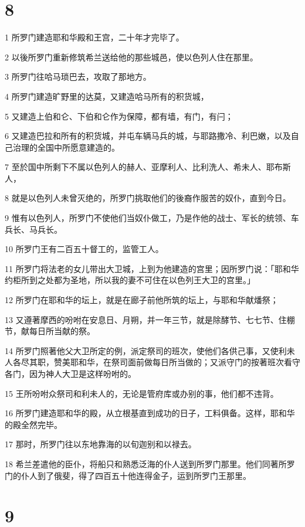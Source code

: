 \chapter{8}

\par 1 所罗门建造耶和华殿和王宫，二十年才完毕了。
\par 2 以後所罗门重新修筑希兰送给他的那些城邑，使以色列人住在那里。
\par 3 所罗门往哈马琐巴去，攻取了那地方。
\par 4 所罗门建造旷野里的达莫，又建造哈马所有的积货城，
\par 5 又建造上伯和仑、下伯和仑作为保障，都有墙，有门，有闩；
\par 6 又建造巴拉和所有的积货城，并屯车辆马兵的城，与耶路撒冷、利巴嫩，以及自己治理的全国中所愿意建造的。
\par 7 至於国中所剩下不属以色列人的赫人、亚摩利人、比利洗人、希未人、耶布斯人，
\par 8 就是以色列人未曾灭绝的，所罗门挑取他们的後裔作服苦的奴仆，直到今日。
\par 9 惟有以色列人，所罗门不使他们当奴仆做工，乃是作他的战士、军长的统领、车兵长、马兵长。
\par 10 所罗门王有二百五十督工的，监管工人。
\par 11 所罗门将法老的女儿带出大卫城，上到为他建造的宫里；因所罗门说：「耶和华约柜所到之处都为圣地，所以我的妻不可住在以色列王大卫的宫里。」
\par 12 所罗门在耶和华的坛上，就是在廊子前他所筑的坛上，与耶和华献燔祭；
\par 13 又遵著摩西的吩咐在安息日、月朔，并一年三节，就是除酵节、七七节、住棚节，献每日所当献的祭。
\par 14 所罗门照著他父大卫所定的例，派定祭司的班次，使他们各供己事，又使利未人各尽其职，赞美耶和华，在祭司面前做每日所当做的；又派守门的按著班次看守各门，因为神人大卫是这样吩咐的。
\par 15 王所吩咐众祭司和利未人的，无论是管府库或办别的事，他们都不违背。
\par 16 所罗门建造耶和华的殿，从立根基直到成功的日子，工料俱备。这样，耶和华的殿全然完毕。
\par 17 那时，所罗门往以东地靠海的以旬迦别和以禄去。
\par 18 希兰差遣他的臣仆，将船只和熟悉泛海的仆人送到所罗门那里。他们同著所罗门的仆人到了俄斐，得了四百五十他连得金子，运到所罗门王那里。

\chapter{9}

